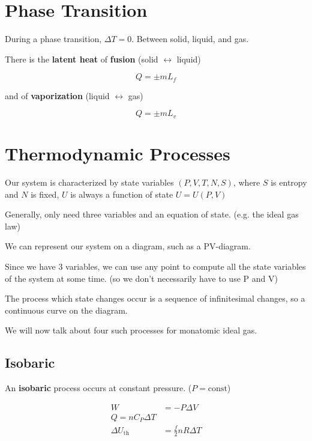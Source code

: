 \section{Phase Transition}

During a phase transition, $\Delta T = 0$. Between solid, liquid, and gas.

There is the \textbf{latent heat} of \textbf{fusion} (solid $\leftrightarrow$ liquid)

\begin{equation}
	Q = \pm m L_f
\end{equation}

and of \textbf{vaporization} (liquid $\leftrightarrow$ gas)

\begin{equation}
	Q = \pm m L_v
\end{equation}

\section{Thermodynamic Processes}

Our system is characterized by state variables $(P,V,T,N,S)$, where $S$ is entropy and $N$ is fixed, $U$ is always a function of state $U = U(P,V)$

Generally, only need three variables and an equation of state. (e.g. the ideal gas law)

We can represent our system on a diagram, such as a PV-diagram.

Since we have 3 variables, we can use any point to compute all the state variables of the system at some time. (so we don't necessarily have to use P and V)

The process which state changes occur is a sequence of infinitesimal changes, so a continuous curve on the diagram.

We will now talk about four such processes for monatomic ideal gas.

\subsection{Isobaric}

An \textbf{isobaric} process occurs at constant pressure. ($P = \mathrm{const}$)

\begin{align}
	W &= -P \Delta V\\
	Q = n C_P \Delta T\\
	\Delta U_\mathrm{th} &= \frac{f}{2}nR\Delta T
\end{align}

